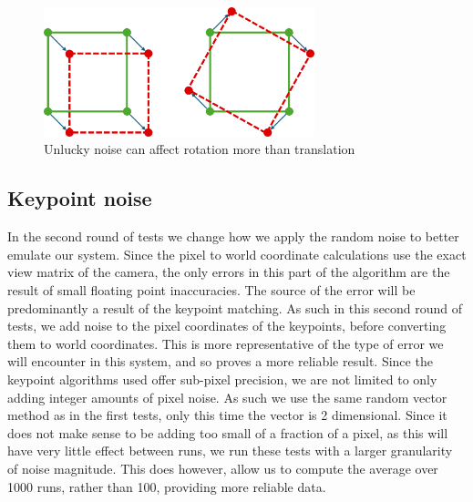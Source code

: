 \begin{figure}[h]
    \centering
    \includegraphics[width=0.7\textwidth]{figures/noise-difference.png}
    \caption{Unlucky noise can affect rotation more than translation}
    \label{fig:noise-difference}
\end{figure}

\subsection{Keypoint noise}
\label{subsec:pixel-noise}
In the second round of tests we change how we apply the random noise to better emulate our system. Since the pixel to world coordinate calculations use the exact view matrix of the camera, the only errors in this part of the algorithm are the result of small floating point inaccuracies. The source of the error will be predominantly a result of the keypoint matching. As such in this second round of tests, we add noise to the pixel coordinates of the keypoints, before converting them to world coordinates. This is more representative of the type of error we will encounter in this system, and so proves a more reliable result. Since the keypoint algorithms used offer sub-pixel precision, we are not limited to only adding integer amounts of pixel noise. As such we use the same random vector method as in the first tests, only this time the vector is 2 dimensional. Since it does not make sense to be adding too small of a fraction of a pixel, as this will have very little effect between runs, we run these tests with a larger granularity of noise magnitude. This does however, allow us to compute the average over 1000 runs, rather than 100, providing more reliable data.\\

